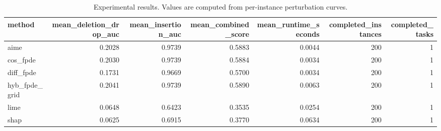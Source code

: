 \begin{table}[t]
\caption{Experimental results. Values are computed from per-instance perturbation curves.}
\label{tab:main_results_computed}
\centering
\begin{tabular}{lrrrrrr}
\toprule
method & mean\_deletion\_drop\_auc & mean\_insertion\_auc & mean\_combined\_score & mean\_runtime\_seconds & completed\_instances & completed\_tasks \\
\midrule
aime & 0.2028 & 0.9739 & 0.5883 & 0.0044 & 200 & 1 \\
cos\_fpde & 0.2030 & 0.9739 & 0.5884 & 0.0034 & 200 & 1 \\
diff\_fpde & 0.1731 & 0.9669 & 0.5700 & 0.0034 & 200 & 1 \\
hyb\_fpde\_grid & 0.2041 & 0.9739 & 0.5890 & 0.0063 & 200 & 1 \\
lime & 0.0648 & 0.6423 & 0.3535 & 0.0254 & 200 & 1 \\
shap & 0.0625 & 0.6915 & 0.3770 & 0.0634 & 200 & 1 \\
\bottomrule
\end{tabular}

\end{table}
